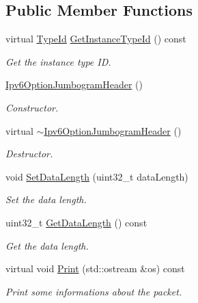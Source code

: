 \subsection*{Public Member Functions}
\begin{DoxyCompactItemize}
\item 
virtual \hyperlink{classns3_1_1TypeId}{Type\+Id} \hyperlink{classns3_1_1Ipv6OptionJumbogramHeader_a6912561e4749b2fe8e6d8e80acfec9c7}{Get\+Instance\+Type\+Id} () const 
\begin{DoxyCompactList}\small\item\em Get the instance type ID. \end{DoxyCompactList}\item 
\hyperlink{classns3_1_1Ipv6OptionJumbogramHeader_a0d79d05e851c6cd29369edf84099b8a1}{Ipv6\+Option\+Jumbogram\+Header} ()
\begin{DoxyCompactList}\small\item\em Constructor. \end{DoxyCompactList}\item 
virtual \hyperlink{classns3_1_1Ipv6OptionJumbogramHeader_af4ffedfad7bedca0444cff0fd5ed9a4f}{$\sim$\+Ipv6\+Option\+Jumbogram\+Header} ()
\begin{DoxyCompactList}\small\item\em Destructor. \end{DoxyCompactList}\item 
void \hyperlink{classns3_1_1Ipv6OptionJumbogramHeader_a96f23e2438f1cdbd081a273f4fb9108c}{Set\+Data\+Length} (uint32\+\_\+t data\+Length)
\begin{DoxyCompactList}\small\item\em Set the data length. \end{DoxyCompactList}\item 
uint32\+\_\+t \hyperlink{classns3_1_1Ipv6OptionJumbogramHeader_a9e06feab1f3c8306a304de8fd3a520f5}{Get\+Data\+Length} () const 
\begin{DoxyCompactList}\small\item\em Get the data length. \end{DoxyCompactList}\item 
virtual void \hyperlink{classns3_1_1Ipv6OptionJumbogramHeader_ae5ab9e909cdb209ad462744a1f8d782c}{Print} (std\+::ostream \&os) const 
\begin{DoxyCompactList}\small\item\em Print some informations about the packet. \end{DoxyCompactList}\item 

\end{DoxyCompactItemize}
